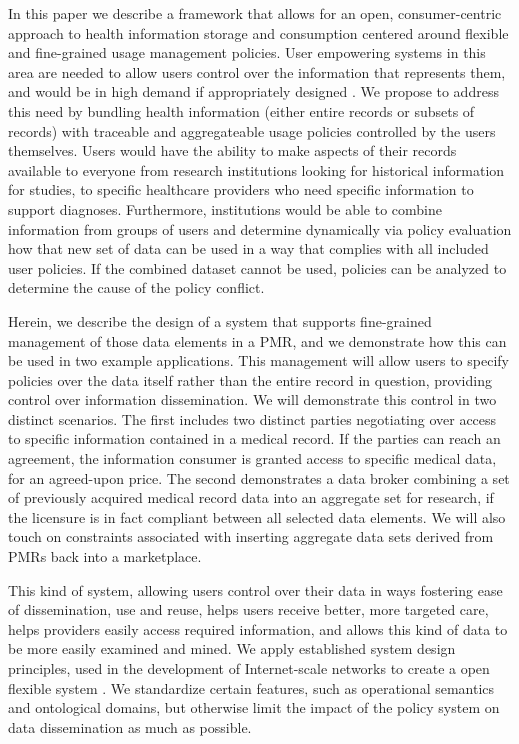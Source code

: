 \documentclass[10pt, conference, compsocconf]{IEEEtran}
\begin{document}
In this paper we describe a framework that allows for an open, consumer-centric approach to health information storage and consumption centered around flexible and fine-grained usage management policies.  User empowering systems in this area are needed to allow users control over the information that represents them, and would be in high demand if appropriately designed \cite{Emr:PyAmWaCr}.  We propose to address this need by bundling health information (either entire records or subsets of records) with traceable and aggregateable usage policies controlled by the users themselves.  Users would have the ability to make aspects of their records available to everyone from research institutions looking for historical information for studies, to specific healthcare providers who need specific information to support diagnoses.  Furthermore, institutions would be able to combine information from groups of users and determine dynamically via policy evaluation how that new set of data can be used in a way that complies with all included user policies.  If the combined dataset cannot be used, policies can be analyzed to determine the cause of the policy conflict.

Herein, we describe the design of a system that supports fine-grained management of those data elements in a PMR, and we demonstrate how this can be used in two example applications.  This management will allow users to specify policies over the data itself rather than the entire record in question, providing control over information dissemination.  We will demonstrate this control in two distinct scenarios.  The first includes two distinct parties negotiating over access to specific information contained in a medical record.  If the parties can reach an agreement, the information consumer is granted access to specific medical data, for an agreed-upon price.  The second demonstrates a data broker combining a set of previously acquired medical record data into an aggregate set for research, if the licensure is in fact compliant between all selected data elements.  We will also touch on constraints associated with inserting aggregate data sets derived from PMRs back into a marketplace.

This kind of system, allowing users control over their data in ways fostering ease of dissemination, use and reuse, helps users receive better, more targeted care, helps providers easily access required information, and allows this kind of data to be more easily examined and mined.  We apply established system design principles, used in the development of Internet-scale networks to create a open flexible system \cite{Al:04,BlCl:01,ClWrSoBr:02}.  We standardize certain features, such as operational semantics and ontological domains, but otherwise limit the impact of the policy system on data dissemination as much as possible.
\end{document}
